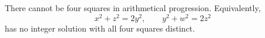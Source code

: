 \begin{proposition}
There cannot be four squares in arithmetical progression. Equivalently,
\[
    x^2+z^2=2y^2,\qquad y^2+w^2=2z^2
\]
has no integer solution with all four squares distinct.
\end{proposition}
